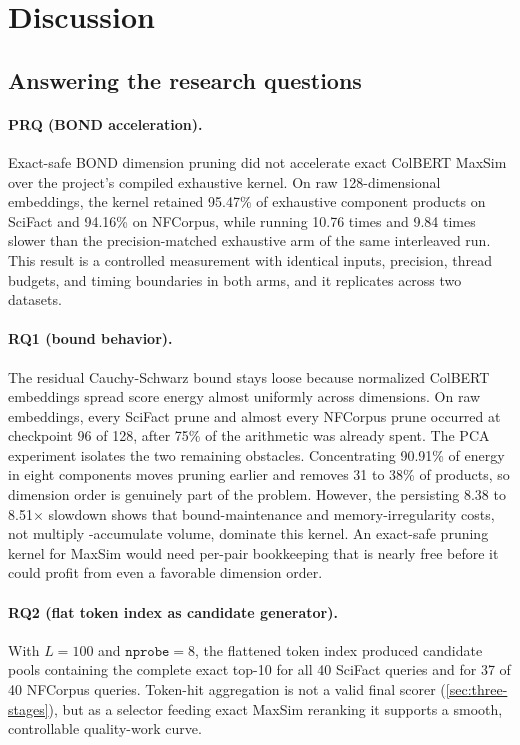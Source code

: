 \section{Discussion}
\label{sec:discussion}

\subsection{Answering the research questions}

\paragraph{PRQ (BOND acceleration).} Exact-safe BOND dimension pruning did 
not accelerate exact ColBERT MaxSim over the project's compiled exhaustive 
kernel. On raw 128-dimensional embeddings, the kernel retained 95.47\% of 
exhaustive component products on SciFact and 94.16\% on NFCorpus, while running 
10.76 times and 9.84 times slower than the precision-matched exhaustive arm of 
the same interleaved run. This result is a controlled measurement with identical 
inputs, precision, thread budgets, and timing boundaries in both arms, and it 
replicates across two datasets.

\paragraph{RQ1 (bound behavior).} The residual Cauchy-Schwarz bound stays
loose because normalized ColBERT embeddings spread score energy almost
uniformly across dimensions. On raw embeddings, every SciFact prune and almost
every NFCorpus prune occurred at checkpoint 96 of 128, after 75\% of the
arithmetic was already spent. The PCA experiment isolates the two remaining
obstacles. Concentrating 90.91\% of energy in eight components moves pruning
earlier and removes 31 to 38\% of products, so dimension order is genuinely part
of the problem. However, the persisting 8.38 to 8.51$\times$ slowdown shows that
bound-maintenance and memory-irregularity costs, not multiply   -accumulate
volume, dominate this kernel. An exact-safe pruning kernel for MaxSim would
need per-pair bookkeeping that is nearly free before it could profit from
even a favorable dimension order.

\paragraph{RQ2 (flat token index as candidate generator).} With $L = 100$ and
$\texttt{nprobe} = 8$, the flattened token index produced candidate pools
containing the complete exact top-10 for all 40 SciFact queries and for 37 of
40 NFCorpus queries. Token-hit aggregation is not a valid final scorer
(\cref{sec:three-stages}), but as a selector feeding exact MaxSim reranking
it supports a smooth, controllable quality-work curve.

